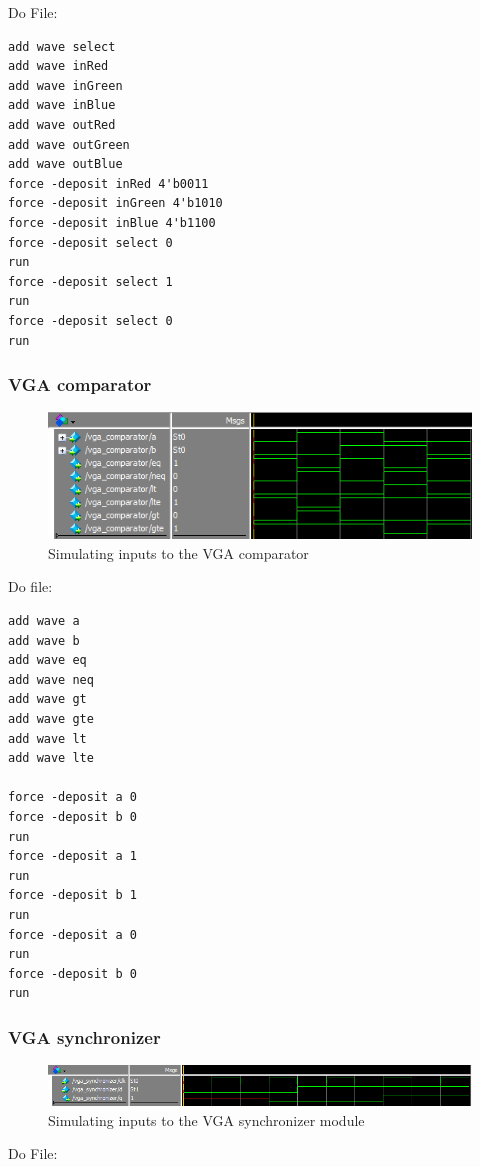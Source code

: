\documentclass[a4paper]{article}
\begin{document}
Do File:

\begin{Verbatim}
add wave select
add wave inRed
add wave inGreen
add wave inBlue
add wave outRed
add wave outGreen
add wave outBlue
force -deposit inRed 4'b0011
force -deposit inGreen 4'b1010
force -deposit inBlue 4'b1100
force -deposit select 0
run
force -deposit select 1
run
force -deposit select 0
run
\end{Verbatim}

\subsubsection{VGA comparator}

\begin{figure}[H]
    \includegraphics[width=0.8 \linewidth]{images/vgaCompSim.png}
    \caption{Simulating inputs to the VGA comparator}
    \label{vgaCompSim}
\end{figure}

Do file:

\begin{Verbatim}
add wave a
add wave b
add wave eq
add wave neq
add wave gt
add wave gte
add wave lt
add wave lte

force -deposit a 0
force -deposit b 0
run
force -deposit a 1
run
force -deposit b 1
run
force -deposit a 0
run
force -deposit b 0
run
\end{Verbatim}

\subsubsection{VGA synchronizer}

\begin{figure}[H]
    \includegraphics[width=0.8 \linewidth]{images/vgaSyncSim.png}
    \caption{Simulating inputs to the VGA synchronizer module}
    \label{vgaSyncSim}
\end{figure}

Do File:
\end{document}
